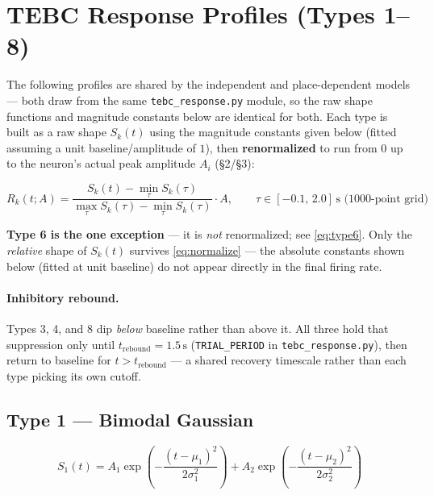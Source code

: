 \documentclass{article}
\begin{document}
\section{TEBC Response Profiles (Types 1--8)}

The following profiles are shared by the independent and place-dependent models ---
both draw from the same \texttt{tebc\_response.py} module, so the raw shape functions
and magnitude constants below are identical for both. Each type is built as a raw
shape $S_k(t)$ using the magnitude constants given below (fitted assuming a unit
baseline/amplitude of $1$), then \textbf{renormalized} to run from $0$ up to the
neuron's actual peak amplitude $A_i$ (\S2/\S3):

\begin{equation}\label{eq:normalize}
    R_k(t; A) = \frac{S_k(t) - \min_\tau S_k(\tau)}{\max_\tau S_k(\tau) - \min_\tau S_k(\tau)} \cdot A,
    \qquad \tau \in [-0.1,\, 2.0]\,\text{s (1000-point grid)}
\end{equation}

\noindent
\textbf{Type 6 is the one exception} --- it is \emph{not} renormalized; see
\eqref{eq:type6}. Only the \emph{relative} shape of $S_k(t)$ survives
\eqref{eq:normalize} --- the absolute constants shown below (fitted at unit baseline)
do not appear directly in the final firing rate.

\paragraph{Inhibitory rebound.} Types 3, 4, and 8 dip \emph{below} baseline rather than
above it. All three hold that suppression only until $t_{\mathrm{rebound}} = 1.5\,\text{s}$
(\texttt{TRIAL\_PERIOD} in \texttt{tebc\_response.py}), then return to baseline for
$t > t_{\mathrm{rebound}}$ --- a shared recovery timescale rather than each type
picking its own cutoff.

\subsection*{Type 1 --- Bimodal Gaussian}

\begin{equation}\label{eq:type1}
    S_1(t) = A_1 \exp\!\left(-\frac{(t-\mu_1)^2}{2\sigma_1^2}\right)
         + A_2 \exp\!\left(-\frac{(t-\mu_2)^2}{2\sigma_2^2}\right)
\end{equation}
\end{document}
